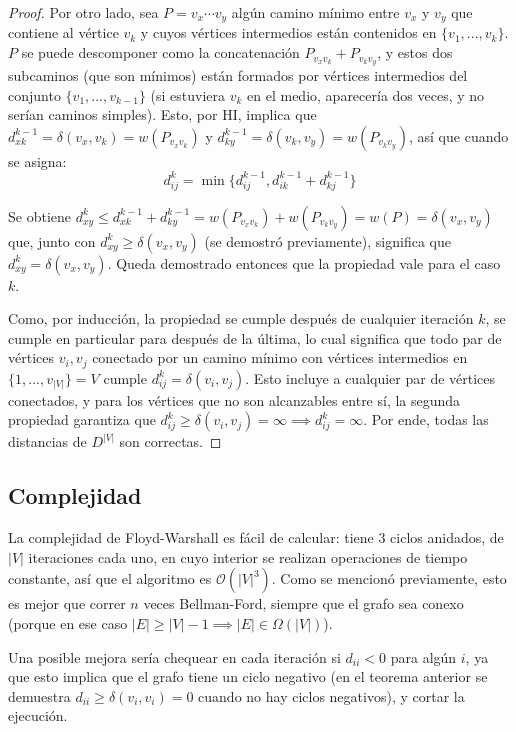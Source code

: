 \documentclass[a4paper]{report}
\newcommand{\BigO}[1]{\ensuremath{\mathcal{O}(#1)}}
\newcommand{\BigOmega}[1]{\ensuremath{\Omega(#1)}}
\begin{document}
\begin{proof}
    Por otro lado, sea $P = v_x \cdots v_y$ algún camino mínimo entre $v_x$ y $v_y$ que contiene al vértice $v_k$ y cuyos vértices intermedios están contenidos en $\{v_1, ..., v_k\}$. $P$ se puede descomponer como la concatenación $P_{v_x v_k} + P_{v_k v_y}$, y estos dos subcaminos (que son mínimos) están formados por vértices intermedios del conjunto $\{v_1, ..., v_{k - 1}\}$ (si estuviera $v_k$ en el medio, aparecería dos veces, y no serían caminos simples). Esto, por HI, implica que $d^{k - 1}_{xk} = \delta(v_x, v_k) = w(P_{v_x v_k})$ y $d^{k - 1}_{ky} = \delta(v_k, v_y) = w(P_{v_k v_y})$, así que cuando se asigna:
    $$d^k_{ij} = \min{\{d^{k - 1}_{ij}, d^{k - 1}_{ik} + d^{k - 1}_{kj}\}}$$

    Se obtiene $d^k_{xy} \leq d^{k - 1}_{xk} + d^{k - 1}_{ky} = w(P_{v_x v_k}) + w(P_{v_k v_y}) = w(P) = \delta(v_x, v_y)$ que, junto con $d^k_{xy} \geq \delta(v_x, v_y)$ (se demostró previamente), significa que $d^k_{xy} = \delta(v_x, v_y)$. Queda demostrado entonces que la propiedad vale para el caso $k$.

    Como, por inducción, la propiedad se cumple después de cualquier iteración $k$, se cumple en particular para después de la última, lo cual significa que todo par de vértices $v_i, v_j$ conectado por un camino mínimo con vértices intermedios en $\{1, ..., v_{|V|}\} = V$ cumple $d^k_{ij} = \delta(v_i, v_j)$. Esto incluye a cualquier par de vértices conectados, y para los vértices que no son alcanzables entre sí, la segunda propiedad garantiza que $d^k_{ij} \geq \delta(v_i, v_j) = \infty \implies d^k_{ij} = \infty$. Por ende, todas las distancias de $D^{|V|}$ son correctas.

\end{proof}

\subsection{Complejidad}

La complejidad de Floyd-Warshall es fácil de calcular: tiene 3 ciclos anidados, de $|V|$ iteraciones cada uno, en cuyo interior se realizan operaciones de tiempo constante, así que el algoritmo es \BigO{|V|^3}. Como se mencionó previamente, esto es mejor que correr $n$ veces Bellman-Ford, siempre que el grafo sea conexo (porque en ese caso $|E| \geq |V| - 1 \implies |E| \in \BigOmega{|V|}$).

Una posible mejora sería chequear en cada iteración si $d_{ii} < 0$ para algún $i$, ya que esto implica que el grafo tiene un ciclo negativo (en el teorema anterior se demuestra $d_{ii} \geq \delta(v_i, v_i) = 0$ cuando no hay ciclos negativos), y cortar la ejecución.
\end{document}
